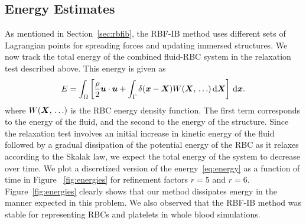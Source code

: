 \subsection{Energy Estimates}\label{sec:energy-est}

As mentioned in Section~\ref{sec:rbfib}, the RBF-IB method uses different sets of
Lagrangian points for spreading forces and updating immersed structures. We now track the
total energy of the combined fluid-RBC system in the relaxation test described above.
This energy is given as 
\begin{align}
    E = \int_\domain \left[\frac{\density}2\u\cdot\u + \int_\interface \Dirac(\x-\X)W(\X,\,\ldots)\d\X\right] \d\x.
\label{eq:energy}
\end{align}
where $W(\boldsymbol{X},\,\ldots)$ is the RBC energy density function. The first term corresponds to
the energy of the fluid, and the second to the energy of the structure. Since the
relaxation test involves an initial increase in kinetic energy of the fluid followed by a
gradual dissipation of the potential energy of the RBC as it relaxes according to the
Skalak law, we expect the total energy of the system to decrease over time. We plot a
discretized version of the energy~\eqref{eq:energy} as a function of time in Figure~%
\ref{fig:energies} for refinement factors $r=5$ and $r=6$. Figure~\ref{fig:energies}
clearly shows that our method dissipates energy in the manner expected in this problem.
We also observed that the RBF-IB method was stable for representing RBCs and platelets in
whole blood simulations.


